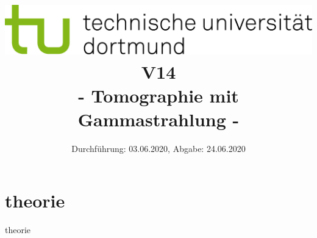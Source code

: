 
\usepackage{romannum}

\title{\includegraphics[scale=0.8]{../logo.jpg} \\ \vspace*{1cm} V14 \\ - Tomographie mit Gammastrahlung -}

\date{Durchführung: 03.06.2020, Abgabe: 24.06.2020}



\maketitle

\tableofcontents
\newpage


\section{theorie}

theorie\cite{anleitung}


\nocite{*}
\printbibliography{}
